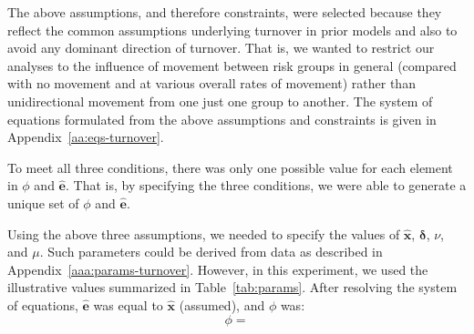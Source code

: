 The above assumptions, and therefore constraints, were selected
because they reflect the common assumptions underlying turnover in prior models	%
and also to avoid any dominant direction of turnover. That is, 
we wanted to restrict our analyses to the influence of movement
between risk groups in general (compared with no movement and at
various overall rates of movement) rather than 
unidirectional movement from one just one group to another.
The system of equations formulated from the above assumptions and constraints
is given in Appendix~\ref{aa:eqs-turnover}.

To meet all three conditions, there was only one possible value			%
for each element in $\phi$ and $\bm{\hat{e}}$.
That is, by specifying the three conditions,						%
we were able to generate a unique set of $\phi$ and $\bm{\hat{e}}$.		%
\par %
Using the above three assumptions,							%
we needed to specify the values of $\bm{\hat{x}}$, $\bm{\delta}$, $\nu$, and $\mu$.
Such parameters could be derived from data as described in Appendix~\ref{aaa:params-turnover}.
However, in this experiment, we used the illustrative values summarized in %
Table~\ref{tab:params}.
After resolving the system of equations,
$\bm{\hat{e}}$ was equal to $\bm{\hat{x}}$ (assumed), and $\phi$ was:
\begin{equation}
\label{eq:phi-values}
\phi = 
\end{equation}
